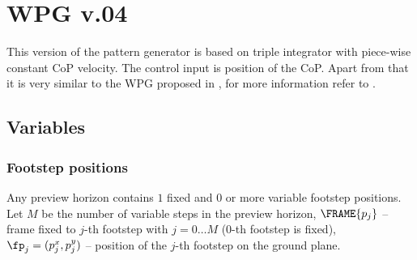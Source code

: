 
\chapter{WPG v.04}

This version of the pattern generator is based on triple integrator with
piece-wise constant \acs{CoP} velocity. The control input is position of the
\acs{CoP}. Apart from that it is very similar to the \acs{WPG} proposed in
\cite{Herdt2010auro}, for more information refer to \cite{Sherikov2016phd}.


\section{Variables}

\subsection{Footstep positions}
Any preview horizon contains $1$ fixed and $0$ or more variable footstep
positions.  Let $M$ be the number of variable steps in the preview horizon,
$\FRAME{p_j}$ -- frame fixed to $j$-th footstep with $j = 0 \dots M$ ($0$-th
footstep is fixed), $\fp_j = (p^x_j, p^y_j)$ -- position of the $j$-th footstep
on the ground plane.


